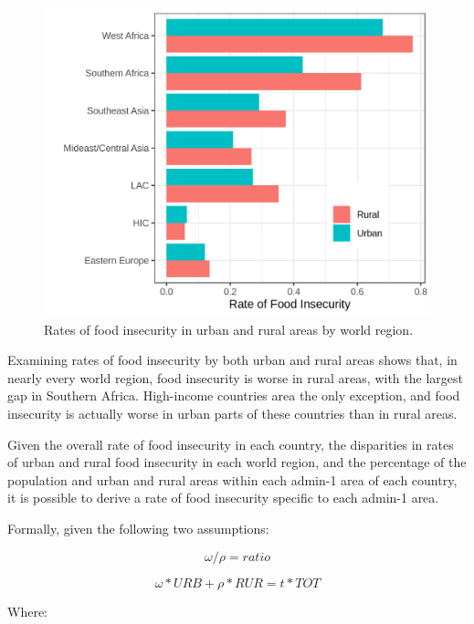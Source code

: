 \documentclass{article}
\begin{document}
\begin{figure}[h]
	\centering
	\includegraphics[width=0.75\linewidth]{../figures/Urban_Rural.png}
	\caption{Rates of food insecurity in urban and rural areas by world region.}
	\label{fig:regionrate}
\end{figure}

Examining rates of food insecurity by both urban and rural areas shows that, in nearly every world region, food insecurity is worse in rural areas, with the largest gap in Southern Africa.  High-income countries area the only exception, and food insecurity is actually worse in urban parts of these countries than in rural areas.

Given the overall rate of food insecurity in each country, the disparities in rates of urban and rural food insecurity in each world region, and the percentage of the population and urban and rural areas within each admin-1 area of each country, it is possible to derive a rate of food insecurity specific to each admin-1 area.

Formally, given the following two assumptions:

\begin{equation} 
\omega / \rho = ratio 
\label{eq1}
\end{equation}

\begin{equation} 
\omega * URB + \rho * RUR = t * TOT
\label{eq2}
\end{equation}
\newline

Where:
\end{document}
